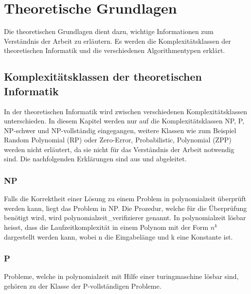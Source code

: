%
%

\chapter{Theoretische Grundlagen}\label{chap.einleitung}
Die theoretischen Grundlagen dient dazu, wichtige Informationen zum Verständnis der Arbeit zu erläutern. Es werden die Komplexitätsklassen der theoretischen Informatik und die verschiedenen 
Algorithmentypen erklärt.

\section{Komplexitätsklassen der theoretischen Informatik}\label{cat_theo_inf}
In der theoretischen Informatik wird zwischen verschiedenen Komplexitätsklassen unterschieden. In diesem Kapitel werden nur auf die Komplexitätsklassen NP, P, NP-schwer und 
NP-vollständig eingegangen, weitere Klassen wie zum Beispiel Random Polynomial (RP) oder Zero-Error, Probabilistic, Polynomial (ZPP) werden nicht erläutert, da sie nicht für das Verständnis der 
Arbeit notwendig sind. Die nachfolgenden Erklärungen sind aus \cite{hopcroft2011einfuehrung} und \cite{slides_p_np} abgeleitet.

\subsection{NP}\label{np}
Falls die Korrektheit einer Lösung zu einem Problem in \gls{polynomialzeit} überprüft werden kann, liegt das Problem in NP. Die Prozedur, welche für die Überprüfung benötigt wird, 
wird \gls{polynomialzeit_verifizierer} genannt.  In \gls{polynomialzeit} lösbar heisst, dass die Laufzeitkomplexität in einem Polynom mit der Form $n^k$ dargestellt werden kann, wobei n die 
Eingabelänge und k eine Konstante ist.

\subsection{P}\label{p_complet}
Probleme, welche in \gls{polynomialzeit} mit Hilfe einer  \gls{turingmaschine} lösbar sind, gehören zu der Klasse der P-vollständigen Probleme.

